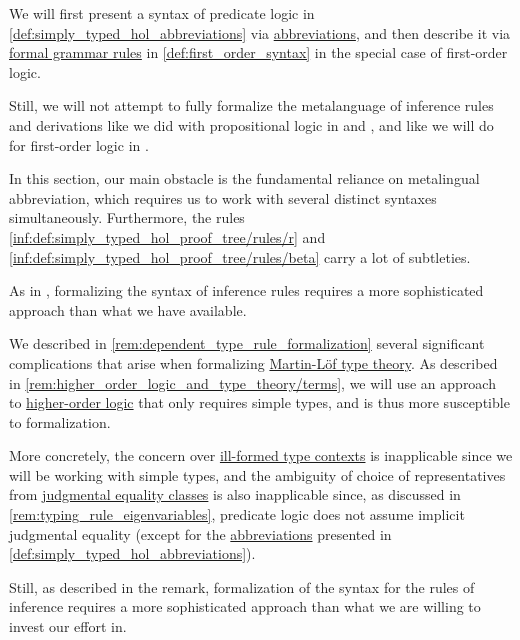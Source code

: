 \begin{remark}\label{rem:predicate_logic_formalization}
  We will first present a syntax of predicate logic in \cref{def:simply_typed_hol_abbreviations} via \hyperref[con:metalingual_abbreviation]{abbreviations}, and then describe it via \hyperref[def:formal_grammar]{formal grammar rules} in \cref{def:first_order_syntax} in the special case of first-order logic.

  Still, we will not attempt to fully formalize the metalanguage of inference rules and derivations like we did with propositional logic in  and , and like we will do for first-order logic in .

  In this section, our main obstacle is the fundamental reliance on metalingual abbreviation, which requires us to work with several distinct syntaxes simultaneously. Furthermore, the rules \ref{inf:def:simply_typed_hol_proof_tree/rules/r} and \ref{inf:def:simply_typed_hol_proof_tree/rules/beta} carry a lot of subtleties.

  As in , formalizing the syntax of inference rules requires a more sophisticated approach than what we have available.
\end{remark}
\begin{comments}
  \item We described in \cref{rem:dependent_type_rule_formalization} several significant complications that arise when formalizing \hyperref[def:mltt]{Martin-L\"of type theory}. As described in \cref{rem:higher_order_logic_and_type_theory/terms}, we will use an approach to \hyperref[rem:predicate_logic]{higher-order logic} that only requires simple types, and is thus more susceptible to formalization.

  More concretely, the concern over \hyperref[rem:well_formed_contexts]{ill-formed type contexts} is inapplicable since we will be working with simple types, and the ambiguity of choice of representatives from \hyperref[con:equality]{judgmental equality classes} is also inapplicable since, as discussed in \cref{rem:typing_rule_eigenvariables}, predicate logic does not assume implicit judgmental equality (except for the \hyperref[con:metalingual_abbreviation]{abbreviations} presented in \cref{def:simply_typed_hol_abbreviations}).

  Still, as described in the remark, formalization of the syntax for the rules of inference requires a more sophisticated approach than what we are willing to invest our effort in.
\end{comments}

